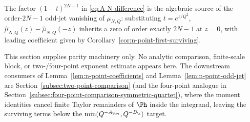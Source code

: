 \begin{remark}
\label{rem:n-point-2N-minus-1-source}
The factor \((1-t)^{2N-1}\) in \eqref{eq:A-N-difference} is the
algebraic source of the order-\(2N-1\) odd-jet vanishing of
\(\widehat\mu_{N,Q}\): substituting \(t=e^{z/Q^2}\),
\(\widehat\mu_{N,Q}(z) - \widehat\mu_{N,Q}(-z)\) inherits a zero of
order exactly \(2N-1\) at \(z=0\), with leading coefficient given by
Corollary~\ref{cor:n-point-first-surviving}.
\end{remark}


\begin{remark}
\label{rem:n-point-scope}
This section supplies parity machinery only.  No
analytic comparison, finite-scale block, or two-/four-point exponent
estimate appears here.  The downstream consumers of
Lemma~\ref{lem:n-point-coefficients} and
Lemma~\ref{lem:n-point-odd-jet} are
Section~\ref{subsec:two-point-comparison} (and the four-point
analogue in
Section~\ref{subsec:four-point-comparison-symmetric-quartet}),
where the moment identities cancel finite Taylor remainders of \(\Ph\)
inside the integrand, leaving the surviving terms below the
\(\min(Q^{-A_\toy}, Q^{-B_\z})\) target.
\end{remark}
